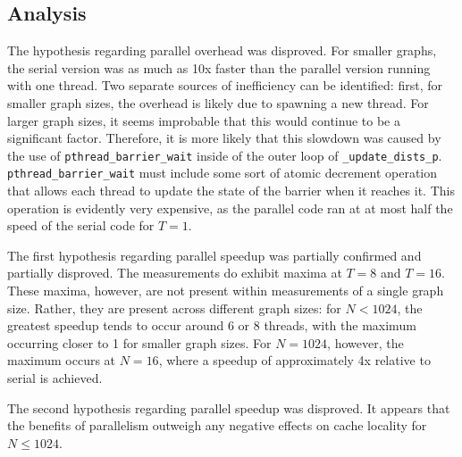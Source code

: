 \documentclass{article}
\begin{document}
\subsection{Analysis}
The hypothesis regarding parallel overhead was disproved. For smaller
graphs, the serial version was as much as 10x faster than the parallel
version running with one thread. Two separate sources of inefficiency
can be identified: first, for smaller graph sizes, the overhead is
likely due to spawning a new thread. For larger graph sizes, it seems
improbable that this would continue to be a significant
factor. Therefore, it is more likely that this slowdown was caused by
the use of
\texttt{pthread\_barrier\_wait} inside of the outer loop of
\texttt{\_update\_dists\_p}. \texttt{pthread\_barrier\_wait} must
include some sort of atomic decrement operation that allows each
thread to update the state of the barrier when it reaches it. This
operation is evidently very expensive, as the parallel code ran at at
most half the speed of the serial code for $T = 1$. 


The first hypothesis regarding parallel speedup was partially confirmed and
partially disproved. The measurements do exhibit maxima at $T = 8$ and
$T = 16$. These maxima, however, are not present within measurements
of a single graph size. Rather, they are present across different
graph sizes: for $N < 1024$, the greatest speedup tends to occur
around 6 or 8 threads, with the maximum occurring closer to 1 for
smaller graph sizes. For $N = 1024$, however, the maximum occurs at $N
= 16$, where a speedup of approximately 4x relative to serial is
achieved. 

The second hypothesis regarding parallel speedup was disproved. It
appears that the benefits of parallelism outweigh any negative effects
on cache locality for $N \leq 1024$.
\end{document}
